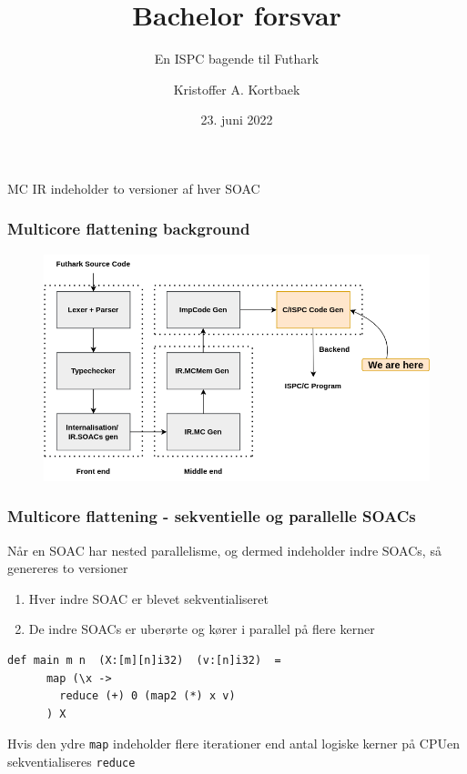 \documentclass[t]{beamer}
\title{Bachelor forsvar}
\subtitle{En ISPC bagende til Futhark}
\author{Kristoffer A. Kortbaek}
\date{23. juni 2022}
\begin{document}
\begin{frame}
  \titlepage
\end{frame}

\begin{frame}
MC IR indeholder to versioner af hver SOAC
  \frametitle{Multicore flattening background}
  \begin{figure}[H]
    \centering
    \includegraphics[height=0.7\textheight]{imgs/compileroverview.png}
  \end{figure}
\end{frame}

\begin{frame}[fragile]
  \frametitle{Multicore flattening - sekventielle og parallelle SOACs}
  Når en SOAC har nested parallelisme, og dermed indeholder indre SOACs, så genereres to versioner
  \begin{enumerate}
    \item{Hver indre SOAC er blevet sekventialiseret}
    \item{De indre SOACs er uberørte og kører i parallel på flere kerner}
  \end{enumerate}

  \begin{lstlisting}[language=futhark]
    def main m n  (X:[m][n]i32)  (v:[n]i32)  =
      map (\x ->
        reduce (+) 0 (map2 (*) x v)
      ) X
    \end{lstlisting}
    Hvis den ydre \texttt{map} indeholder flere iterationer end antal logiske kerner på CPUen sekventialiseres \texttt{reduce}

  \end{frame}
\end{document}
